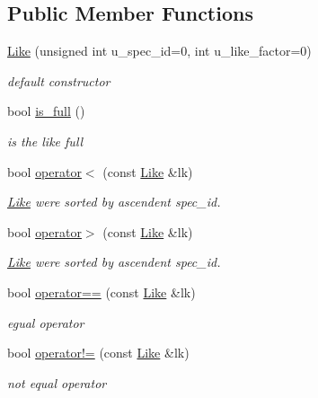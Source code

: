 \subsection*{Public Member Functions}
\begin{DoxyCompactItemize}
\item 
\hyperlink{structLike_ab1a696c6ed0f66421839b465d34a6da0}{Like} (unsigned int u\_\-spec\_\-id=0, int u\_\-like\_\-factor=0)
\begin{DoxyCompactList}\small\item\em default constructor \end{DoxyCompactList}\item 
bool \hyperlink{structLike_a507be8608c74775b568f093e15decbf1}{is\_\-full} ()
\begin{DoxyCompactList}\small\item\em is the like full \end{DoxyCompactList}\item 
\hypertarget{structLike_a0b36906c501104cbd13c0de9f02c2496}{
bool \hyperlink{structLike_a0b36906c501104cbd13c0de9f02c2496}{operator$<$} (const \hyperlink{structLike}{Like} \&lk)}
\label{structLike_a0b36906c501104cbd13c0de9f02c2496}

\begin{DoxyCompactList}\small\item\em \hyperlink{structLike}{Like} were sorted by ascendent spec\_\-id. \end{DoxyCompactList}\item 
\hypertarget{structLike_ae518b00028574d3ae76e9f8a77dfc846}{
bool \hyperlink{structLike_ae518b00028574d3ae76e9f8a77dfc846}{operator$>$} (const \hyperlink{structLike}{Like} \&lk)}
\label{structLike_ae518b00028574d3ae76e9f8a77dfc846}

\begin{DoxyCompactList}\small\item\em \hyperlink{structLike}{Like} were sorted by ascendent spec\_\-id. \end{DoxyCompactList}\item 
\hypertarget{structLike_aaf5f350734bfe2863099ee5a8310e313}{
bool \hyperlink{structLike_aaf5f350734bfe2863099ee5a8310e313}{operator==} (const \hyperlink{structLike}{Like} \&lk)}
\label{structLike_aaf5f350734bfe2863099ee5a8310e313}

\begin{DoxyCompactList}\small\item\em egual operator \end{DoxyCompactList}\item 
\hypertarget{structLike_a87ad505da19caa25877a86b172b2a036}{
bool \hyperlink{structLike_a87ad505da19caa25877a86b172b2a036}{operator!=} (const \hyperlink{structLike}{Like} \&lk)}
\label{structLike_a87ad505da19caa25877a86b172b2a036}

\begin{DoxyCompactList}\small\item\em not equal operator \end{DoxyCompactList}\end{DoxyCompactItemize}
